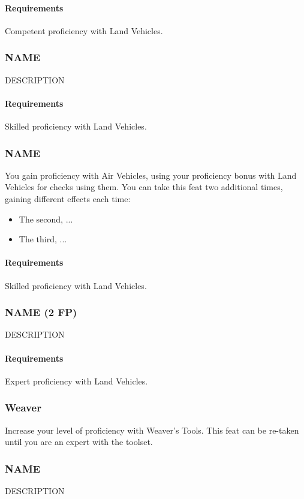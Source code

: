     \paragraph{Requirements} Competent proficiency with Land Vehicles.
\subsubsection{NAME} \label{feat::name}
    DESCRIPTION
    \paragraph{Requirements} Skilled proficiency with Land Vehicles.
\subsubsection{NAME} \label{feat::name}
    You gain proficiency with Air Vehicles, using your proficiency bonus with Land Vehicles for checks using them.
    You can take this feat two additional times, gaining different effects each time:
    \begin{itemize}
        \item The second, ...
        \item The third, ... %
    \end{itemize}
    \paragraph{Requirements} Skilled proficiency with Land Vehicles.
\subsubsection{NAME (2 FP)} \label{feat::name}
    DESCRIPTION
    \paragraph{Requirements} Expert proficiency with Land Vehicles.
\subsubsection{Weaver} \label{feat::weaver}
    Increase your level of proficiency with Weaver's Tools.
    This feat can be re-taken until you are an expert with the toolset.
\subsubsection{NAME} \label{feat::name}
    DESCRIPTION
